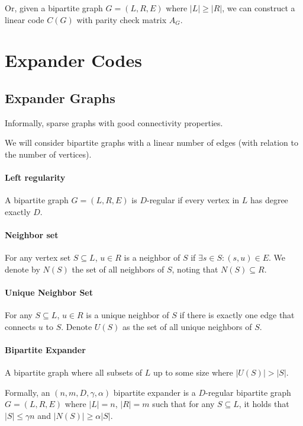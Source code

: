 \documentclass{idc_msc}
\begin{document}
Or, given a bipartite graph \(G = (L, R, E)\) where \(|L| \ge |R|\), we can construct a linear code \(C(G)\) with parity check matrix \(A_G\).

\section{Expander Codes}

\subsection{Expander Graphs}

Informally, sparse graphs with good connectivity properties.

We will consider bipartite graphs with a linear number of edges (with relation to the number of vertices).

\paragraph{Left regularity}

A bipartite graph \(G = (L, R, E)\) is \(D\)-regular if every vertex in \(L\) has degree exactly \(D\).

\paragraph{Neighbor set}

For any vertex set \(S \subseteq L\), \(u \in R\) is a neighbor of \(S\) if \(\exists s \in S : (s,u) \in E\).
We denote by \(N(S)\) the set of all neighbors of \(S\), noting that \(N(S) \subseteq R\).

\paragraph{Unique Neighbor Set}

For any \(S \subseteq L\), \(u \in R\) is a unique neighbor of \(S\) if there is exactly one edge that connects \(u\) to \(S\).
Denote \(U(S)\) as the set of all unique neighbors of \(S\).

\paragraph{Bipartite Expander}

A bipartite graph where all subsets of \(L\) up to some size where \(|U(S)| > |S|\).

Formally, an \((n, m, D, \gamma, \alpha)\) bipartite expander is a \(D\)-regular bipartite graph \(G = (L, R, E)\) where \(|L|=n\), \(|R| = m\) such that for any \(S \subseteq L\), it holds that \(|S| \le \gamma n\) and \(|N(S)| \ge \alpha |S|\).
\end{document}
